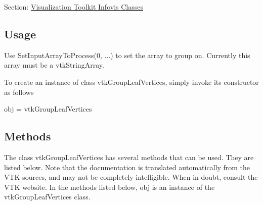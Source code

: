 Section\-: \hyperlink{sec_vtkinfovis}{Visualization Toolkit Infovis Classes} \hypertarget{vtkwidgets_vtkxyplotwidget_Usage}{}\subsection{Usage}\label{vtkwidgets_vtkxyplotwidget_Usage}
Use Set\-Input\-Array\-To\-Process(0, ...) to set the array to group on. Currently this array must be a vtk\-String\-Array.

To create an instance of class vtk\-Group\-Leaf\-Vertices, simply invoke its constructor as follows \begin{DoxyVerb}  obj = vtkGroupLeafVertices
\end{DoxyVerb}
 \hypertarget{vtkwidgets_vtkxyplotwidget_Methods}{}\subsection{Methods}\label{vtkwidgets_vtkxyplotwidget_Methods}
The class vtk\-Group\-Leaf\-Vertices has several methods that can be used. They are listed below. Note that the documentation is translated automatically from the V\-T\-K sources, and may not be completely intelligible. When in doubt, consult the V\-T\-K website. In the methods listed below, {\ttfamily obj} is an instance of the vtk\-Group\-Leaf\-Vertices class. 
